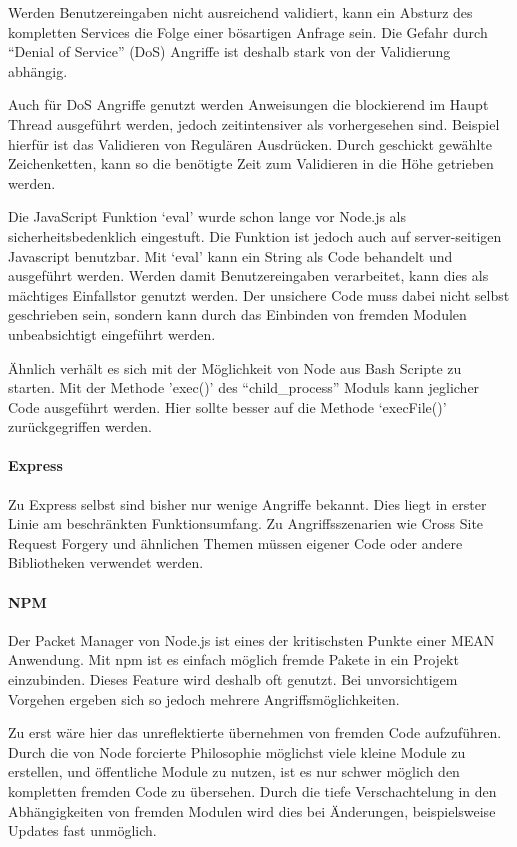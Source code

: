 \documentclass[]{article}
\begin{document}
Werden Benutzereingaben nicht ausreichend validiert, kann ein Absturz
des kompletten Services die Folge einer bösartigen Anfrage sein. Die
Gefahr durch ``Denial of Service'' (DoS) Angriffe ist deshalb stark von
der Validierung abhängig.

Auch für DoS Angriffe genutzt werden Anweisungen die blockierend im
Haupt Thread ausgeführt werden, jedoch zeitintensiver als vorhergesehen
sind. Beispiel hierfür ist das Validieren von Regulären Ausdrücken.
Durch geschickt gewählte Zeichenketten, kann so die benötigte Zeit zum
Validieren in die Höhe getrieben werden.

Die JavaScript Funktion `eval' wurde schon lange vor Node.js als
sicherheitsbedenklich eingestuft. Die Funktion ist jedoch auch auf
server-seitigen Javascript benutzbar. Mit `eval' kann ein String als
Code behandelt und ausgeführt werden. Werden damit Benutzereingaben
verarbeitet, kann dies als mächtiges Einfallstor genutzt werden. Der
unsichere Code muss dabei nicht selbst geschrieben sein, sondern kann
durch das Einbinden von fremden Modulen unbeabsichtigt eingeführt
werden.

Ähnlich verhält es sich mit der Möglichkeit von Node aus Bash Scripte zu
starten. Mit der Methode 'exec()' des ``child\_process'' Moduls kann
jeglicher Code ausgeführt werden. Hier sollte besser auf die Methode
`execFile()' zurückgegriffen werden.

\paragraph{Express}\label{express}

Zu Express selbst sind bisher nur wenige Angriffe bekannt. Dies liegt in
erster Linie am beschränkten Funktionsumfang. Zu Angriffsszenarien wie
Cross Site Request Forgery und ähnlichen Themen müssen eigener Code oder
andere Bibliotheken verwendet werden.

\paragraph{NPM}\label{npm}

Der Packet Manager von Node.js ist eines der kritischsten Punkte einer
MEAN Anwendung. Mit npm ist es einfach möglich fremde Pakete in ein
Projekt einzubinden. Dieses Feature wird deshalb oft genutzt. Bei
unvorsichtigem Vorgehen ergeben sich so jedoch mehrere
Angriffsmöglichkeiten.

Zu erst wäre hier das unreflektierte übernehmen von fremden Code
aufzuführen. Durch die von Node forcierte Philosophie möglichst viele
kleine Module zu erstellen, und öffentliche Module zu nutzen, ist es nur
schwer möglich den kompletten fremden Code zu übersehen. Durch die tiefe
Verschachtelung in den Abhängigkeiten von fremden Modulen wird dies bei
Änderungen, beispielsweise Updates fast unmöglich.
\end{document}
